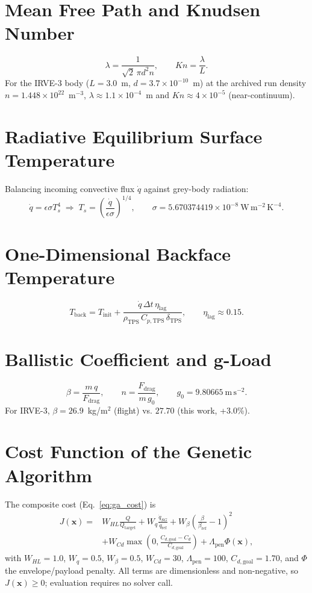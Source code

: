 \section{Mean Free Path and Knudsen Number}
\[
\lambda=\frac{1}{\sqrt2\,\pi d^2 n},\qquad Kn=\frac{\lambda}{L}.
\]
For the IRVE-3 body ($L=3.0$~m, $d=3.7\times10^{-10}$~m) at the archived run
density $n=1.448\times10^{22}$~m$^{-3}$, $\lambda\approx1.1\times10^{-4}$~m and
$Kn\approx4\times10^{-5}$ (near-continuum).

\section{Radiative Equilibrium Surface Temperature}
Balancing incoming convective flux $\dot q$ against grey-body radiation:
\[
\dot q=\epsilon\sigma T_s^4 \;\Rightarrow\;
T_s=\left(\frac{\dot q}{\epsilon\sigma}\right)^{1/4},
\qquad \sigma=5.670374419\times10^{-8}\ \mathrm{W\,m^{-2}\,K^{-4}}.
\]

\section{One-Dimensional Backface Temperature}
\[
T_{\mathrm{back}}=T_{\mathrm{init}}
+\frac{\dot q\,\Delta t\,\eta_{\mathrm{lag}}}
{\rho_{\mathrm{TPS}}\,C_{p,\mathrm{TPS}}\,\delta_{\mathrm{TPS}}},
\qquad \eta_{\mathrm{lag}}\approx0.15.
\]

\section{Ballistic Coefficient and g-Load}
\[
\beta=\frac{m\,q}{F_{\mathrm{drag}}},\qquad
n=\frac{F_{\mathrm{drag}}}{m\,g_0},\qquad g_0=9.80665\ \mathrm{m\,s^{-2}}.
\]
For IRVE-3, $\beta=26.9$~kg/m$^2$ (flight) vs. $27.70$ (this work, +3.0\%).

\section{Cost Function of the Genetic Algorithm}
The composite cost (Eq.~\eqref{eq:ga_cost}) is
\[
\begin{aligned}
J(\mathbf x)={}&W_{HL}\frac{Q}{Q_{\mathrm{target}}}
+W_q\frac{\dot q_{SG}}{\dot q_{\mathrm{ref}}}
+W_\beta\left(\frac{\beta}{\beta_{\mathrm{ref}}}-1\right)^2\\
&+W_{Cd}\max\!\left(0,\frac{C_{d,\mathrm{goal}}-C_d}{C_{d,\mathrm{goal}}}\right)
+\Lambda_{\mathrm{pen}}\Phi(\mathbf x),
\end{aligned}
\]
with $W_{HL}=1.0$, $W_q=0.5$, $W_\beta=0.5$, $W_{Cd}=30$,
$\Lambda_{\mathrm{pen}}=100$, $C_{d,\mathrm{goal}}=1.70$, and
$\Phi$ the envelope/payload penalty. All terms are dimensionless and
non-negative, so $J(\mathbf x)\ge0$; evaluation requires no solver call.

